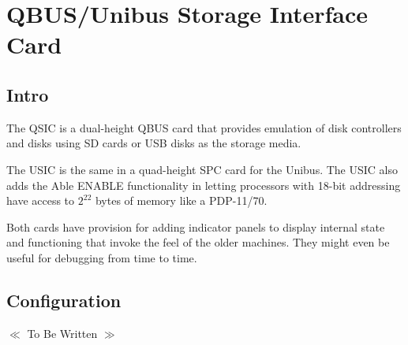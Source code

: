 %

\chapter{QBUS/Unibus Storage Interface Card}
\section{Intro}
The QSIC is a dual-height QBUS card that provides emulation of disk
controllers and disks using SD cards or USB disks as the storage
media.

The USIC is the same in a quad-height SPC card for the Unibus.  The
USIC also adds the Able ENABLE functionality in letting processors
with 18-bit addressing have access to $2^{22}$ bytes of memory like a
PDP-11/70.

Both cards have provision for adding indicator panels to display
internal state and functioning that invoke the feel of the older
machines.  They might even be useful for debugging from time to time.

\section{Configuration}

\begin{center}
  $\ll$ To Be Written $\gg$
\end{center}
